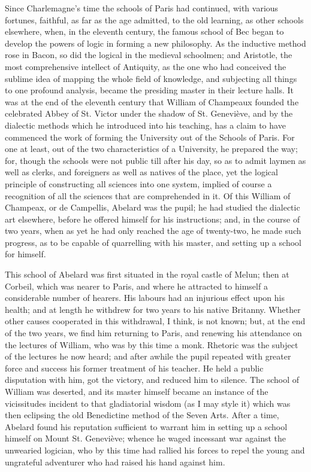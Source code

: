 Since Charlemagne's time the
schools of Paris had continued, with various fortunes, faithful, as
far as the age admitted, to the old learning, as other schools
elsewhere, when, in the eleventh century, the famous school of Bec
began to develop the powers of logic in forming a new philosophy. As
the inductive method rose in Bacon, so did the logical in the medieval
schoolmen; and Aristotle, the most comprehensive intellect of
Antiquity, as the one who had conceived the sublime idea of mapping
the whole field of knowledge, and subjecting all things to one
profound analysis, became the presiding master in their lecture halls.
It was at the end of the eleventh century that William of Champeaux
founded the celebrated Abbey of St. Victor under the shadow of St.
Geneviève, and by the dialectic methods which he introduced into his
teaching, has a claim to have commenced the work of forming the
University out of the Schools of Paris. For one at least, out of the
two characteristics of a University, he prepared the way; for,
though the schools were not public till after his day, so as to admit
laymen as well as clerks, and foreigners as well as natives of the
place, yet the logical principle of constructing all sciences into one
system, implied of course a recognition of all the sciences that are
comprehended in it. Of this William of Champeax, or de Campellis,
Abelard was the pupil; he had studied the dialectic art elsewhere,
before he offered himself for his instructions; and, in the course of
two years, when as yet he had only reached the age of twenty-two, he
made such progress, as to be capable of quarrelling with his master,
and setting up a school for himself.

This school of Abelard was
first situated in the royal castle of Melun; then at Corbeil, which
was nearer to Paris, and where he attracted to himself a considerable
number of hearers. His labours had an injurious effect upon his
health; and at length he withdrew for two years to his native Britanny.
Whether other causes cooperated in this withdrawal, I think, is not
known; but, at the end of the two years, we find him returning to
Paris, and renewing his attendance on the lectures of William, who was
by this time a monk. Rhetoric was the subject of the lectures he now
heard; and after awhile the pupil repeated with greater force and
success his former treatment of his teacher. He held a public
disputation with him, got the victory, and reduced him to silence. The
school of William was deserted, and its master himself became an
instance of the vicissitudes incident to that gladiatorial wisdom (as
I may style it) which was then eclipsing the old Benedictine method of
the Seven Arts. After a time, Abelard found his reputation sufficient
to warrant him in setting up a school himself on Mount St. Geneviève;
whence he waged incessant war against the unwearied logician,
who by this time had rallied his forces to repel the young and
ungrateful adventurer who had raised his hand against him.

